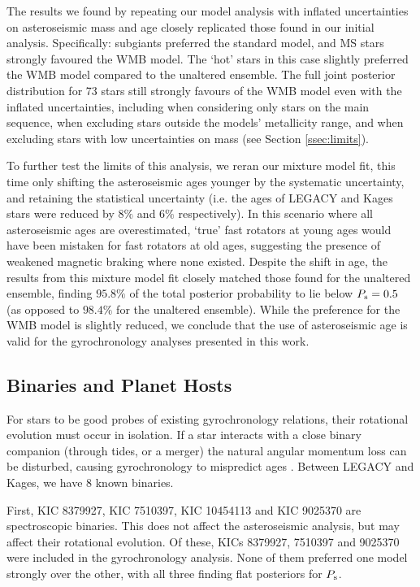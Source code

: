 \documentclass[12pt]{article}
\begin{document}
The results we found by repeating our model analysis with inflated uncertainties on asteroseismic mass and age closely replicated those found in our initial analysis. Specifically: subgiants preferred the standard model, and MS stars strongly favoured the WMB model. The `hot' stars in this case slightly preferred the WMB model compared to the unaltered ensemble. The full joint posterior distribution for 73 stars still strongly favours of the WMB model even with the inflated uncertainties, including when considering only stars on the main sequence, when excluding stars outside the models' metallicity range, and when excluding stars with low uncertainties on mass (see Section \ref{ssec:limits}).

To further test the limits of this analysis, we reran our mixture model fit, this time only shifting the asteroseismic ages younger by the systematic uncertainty, and retaining the statistical uncertainty (i.e. the ages of LEGACY and Kages stars were reduced by $8\%$ and $6\%$ respectively). In this scenario where all asteroseismic ages are overestimated, `true' fast rotators at young ages would have been mistaken for fast rotators at old ages, suggesting the presence of weakened magnetic braking where none existed. Despite the shift in age, the results from this mixture model fit closely matched those found for the unaltered ensemble, finding $95.8\%$ of the total posterior probability to lie below $P_{\rm s} = 0.5$ (as opposed to $98.4\%$ for the unaltered ensemble). While the preference for the WMB model is slightly reduced, we conclude that the use of asteroseismic age is valid for the gyrochronology analyses presented in this work.

\subsection{Binaries and Planet Hosts}
For stars to be good probes of existing gyrochronology relations, their rotational evolution must occur in isolation. If a star interacts with a close binary companion (through tides, or a merger) the natural angular momentum loss can be disturbed, causing gyrochronology to mispredict ages \cite{leiner+2019, fleming+2019}. Between LEGACY and Kages, we have 8 known binaries. 

First, KIC 8379927, KIC 7510397, KIC 10454113 and KIC 9025370 are spectroscopic binaries. This does not affect the asteroseismic analysis, but may affect their rotational evolution. Of these, KICs 8379927, 7510397 and 9025370 were included in the gyrochronology analysis. None of them preferred one model strongly over the other, with all three finding flat posteriors for $P_{\rm s}$.
\end{document}
